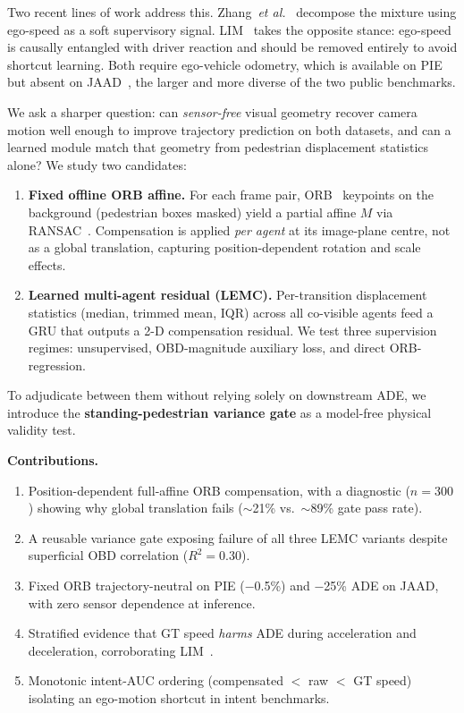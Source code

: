 \documentclass[conference]{IEEEtran}
\begin{document}
Two recent lines of work address this.
Zhang~\textit{et al.}~\cite{zhang2024decouple} decompose the mixture using ego-speed as a soft supervisory signal.
LIM~\cite{lim2025tits} takes the opposite stance: ego-speed is causally entangled with driver reaction and should be removed entirely to avoid shortcut learning.
Both require ego-vehicle odometry, which is available on PIE~\cite{rasouli2019pie} but absent on JAAD~\cite{kotseruba2017jaad}, the larger and more diverse of the two public benchmarks.

We ask a sharper question: can \emph{sensor-free} visual geometry recover camera motion well enough to improve trajectory prediction on both datasets, and can a learned module match that geometry from pedestrian displacement statistics alone?
We study two candidates:
\begin{enumerate}[leftmargin=1.4em,itemsep=1pt,topsep=2pt]
  \item \textbf{Fixed offline ORB affine.} For each frame pair, ORB~\cite{rublee2011orb} keypoints on the background (pedestrian boxes masked) yield a partial affine $M$ via RANSAC~\cite{fischler1981ransac}.
        Compensation is applied \emph{per agent} at its image-plane centre, not as a global translation, capturing position-dependent rotation and scale effects.
  \item \textbf{Learned multi-agent residual (LEMC).} Per-transition displacement statistics (median, trimmed mean, IQR) across all co-visible agents feed a GRU that outputs a 2-D compensation residual.
        We test three supervision regimes: unsupervised, OBD-magnitude auxiliary loss, and direct ORB-regression.
\end{enumerate}
To adjudicate between them without relying solely on downstream ADE, we introduce the \textbf{standing-pedestrian variance gate} as a model-free physical validity test.

\textbf{Contributions.}
\begin{enumerate}[leftmargin=1.4em,itemsep=1pt,topsep=2pt]
  \item Position-dependent full-affine ORB compensation, with a diagnostic ($n{=}300$) showing why global translation fails ($\sim$21\% vs.\ $\sim$89\% gate pass rate).
  \item A reusable variance gate exposing failure of all three LEMC variants despite superficial OBD correlation ($R^2{=}0.30$).
  \item Fixed ORB trajectory-neutral on PIE ($-$0.5\%) and $-$25\% ADE on JAAD, with zero sensor dependence at inference.
  \item Stratified evidence that GT speed \emph{harms} ADE during acceleration and deceleration, corroborating LIM~\cite{lim2025tits}.
  \item Monotonic intent-AUC ordering (compensated $<$ raw $<$ GT speed) isolating an ego-motion shortcut in intent benchmarks.
\end{enumerate}
\end{document}
